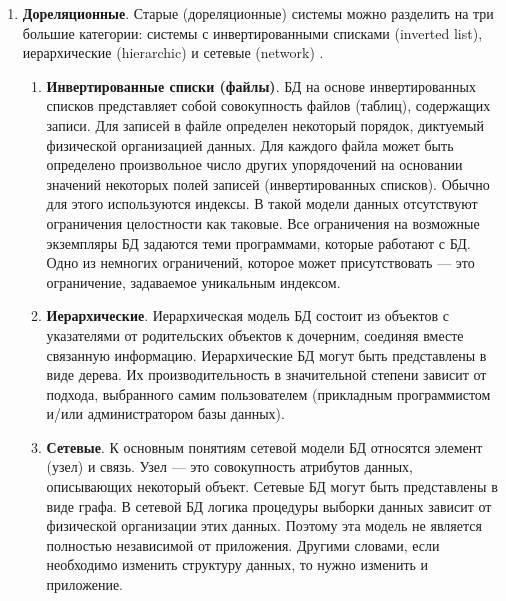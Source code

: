 \begin{enumerate}[label*=\arabic*.]
	\item \textbf{Дореляционные}. \newline
	Старые (дореляционные) системы можно разделить на три большие категории: системы с инвертированными списками (inverted list), иерархические (hierarchic) и сетевые (network) \cite{Date_old}. 
	
		
	\begin{enumerate}[label*=\arabic*.]
		\item \textbf{Инвертированные списки (файлы)}. \newline
		БД на основе инвертированных списков представляет собой совокупность файлов (таблиц), содержащих записи. Для записей в файле определен некоторый порядок, диктуемый физической организацией данных. Для каждого файла может быть определено произвольное число других упорядочений на основании значений некоторых полей записей (инвертированных списков). Обычно для этого используются индексы. В такой модели данных отсутствуют ограничения целостности как таковые. Все ограничения на возможные экземпляры БД задаются теми программами, которые работают с БД. Одно из немногих ограничений, которое может присутствовать --- это ограничение, задаваемое уникальным индексом. 
		
		\item \textbf{Иерархические}. \newline
		Иерархическая модель БД состоит из объектов с указателями от родительских объектов к дочерним, соединяя вместе связанную информацию. Иерархические БД могут быть представлены в виде дерева. Их производительность в значительной степени зависит от подхода, выбранного самим пользователем (прикладным программистом и/или администратором базы данных).
		
		\item \textbf{Сетевые}. \newline
		К основным понятиям сетевой модели БД относятся элемент (узел) и связь. Узел --- это совокупность атрибутов данных, описывающих некоторый объект. Сетевые БД могут быть представлены в виде графа. В сетевой БД логика процедуры выборки данных зависит от физической организации этих данных. Поэтому эта модель не является полностью независимой от приложения. Другими словами, если необходимо изменить структуру данных, то нужно изменить и приложение.
		

\end{enumerate}
\end{enumerate}
